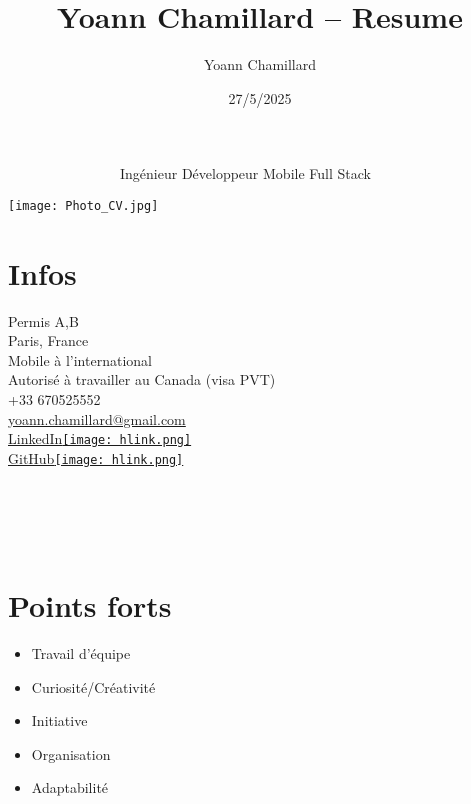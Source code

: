 \documentclass[]{friggeri-cv}
\title{Yoann Chamillard -- Resume}
\author{Yoann Chamillard}
\date{27/5/2025}
\begin{document}
      {~~~~~~~~~~~~~~~~Ingénieur Développeur Mobile Full Stack}
      {}

\begin{aside}
\hspace{10mm}\texttt{[image: Photo\_CV.jpg]}
\section{Infos}

Permis A,B\\
\vspace{2.5mm}
Paris, France\\
\vspace{1.5mm}
Mobile à l'international\\
Autorisé à travailler au Canada (visa PVT)\\
\vspace{2.5mm}
+33 670525552\\
\href{mailto:yoann.chamillard@gmail.com}{\small yoann.chamillard@gmail.com}\\
\vspace{2.5mm}
\href{http://fr.linkedin.com/in/yoannchamillard}{LinkedIn\hspace{1.5mm}\texttt{[image: hlink.png]}}\\
\href{https://github.com/Nokheenig?tab=stars}{GitHub\hspace{1.5mm}\texttt{[image: hlink.png]}}\\
\vspace{2.5mm}
\\
\\
\\
\\
\vspace{2.5mm}%

\section{Points forts}
\begin{itemize}
\item Travail d'équipe
\item Curiosité/Créativité
\item Initiative
\item Organisation
\item Adaptabilité
\end{itemize}

\end{aside}
\end{document}

